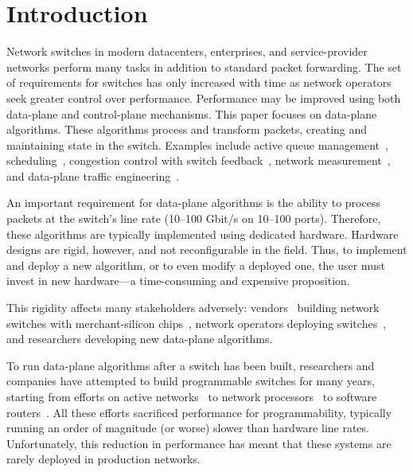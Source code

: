 \newpage
\section{Introduction}
\label{s:intro}

Network switches in modern datacenters, enterprises, and service-provider
networks perform many tasks in addition to standard packet forwarding. The set
of requirements for switches has only increased with time as network operators
seek greater control over performance.  Performance may be improved using both
data-plane and control-plane mechanisms. This paper focuses on data-plane
algorithms. These algorithms process and transform packets, creating and
maintaining state in the switch. Examples include active queue
management~\cite{red,avq,codel}, scheduling~\cite{pifo_hotnets}, congestion
control with switch feedback~\cite{xcp, rcp}, network
measurement~\cite{opensketch, bitmap_george}, and data-plane traffic
engineering~\cite{conga}.

An important requirement for data-plane algorithms is the ability to process
packets at the switch's line rate (10--100 Gbit/s on 10--100 ports).
Therefore, these algorithms are typically implemented using dedicated hardware.
Hardware designs are rigid, however, and not reconfigurable in the field. Thus,
to implement and deploy a new algorithm, or to even modify a deployed one, the
user must invest in new hardware---a time-consuming and expensive proposition.

This rigidity affects many stakeholders adversely: vendors~\cite{cisco_nexus,
dell_force10, arista_7050} building network switches with merchant-silicon
chips~\cite{trident, tomahawk, mellanox}, network operators deploying
switches~\cite{google,facebook,vl2}, and researchers developing new data-plane
algorithms.

To run data-plane algorithms after a switch has been built, researchers and
companies have attempted to build programmable switches for many years,
starting from efforts on active networks~\cite{active-nets} to network
processors~\cite{ixp4xx} to software routers~\cite{click, dpdk}. All these
efforts sacrificed performance for programmability, typically running an order
of magnitude (or worse) slower than hardware line rates. Unfortunately, this
reduction in performance has meant that these systems are rarely deployed in
production networks.

